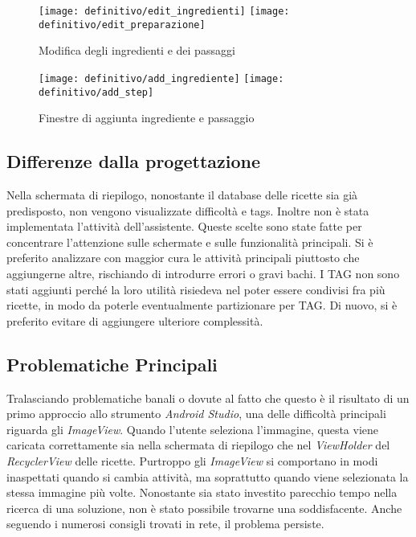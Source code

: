 \begin{figure}[ht]
  \begin{center}
    \texttt{[image: definitivo/edit\_ingredienti]}
    \texttt{[image: definitivo/edit\_preparazione]}
    \caption{Modifica degli ingredienti e dei passaggi}
    \label{fig:def_edit_ricetta}
  \end{center}
\end{figure}

\begin{figure}[ht]
  \begin{center}
    \texttt{[image: definitivo/add\_ingrediente]}
    \texttt{[image: definitivo/add\_step]}
    \caption{Finestre di aggiunta ingrediente e passaggio}
    \label{fig:def_edit_ricetta_1}
  \end{center}
\end{figure}

\clearpage
\subsection{Differenze dalla progettazione}
Nella schermata di riepilogo, nonostante il database delle ricette sia già predisposto, non vengono visualizzate difficoltà e tags.
Inoltre non è stata implementata l'attività dell'assistente.
Queste scelte sono state fatte per concentrare l'attenzione sulle schermate e sulle funzionalità principali.
Si è preferito analizzare con maggior cura le attività principali piuttosto che aggiungerne altre, rischiando di introdurre errori o gravi bachi.
I TAG non sono stati aggiunti perché la loro utilità risiedeva nel poter essere condivisi fra più ricette, in modo da poterle eventualmente partizionare per TAG.
Di nuovo, si è preferito evitare di aggiungere ulteriore complessità.

\subsection{Problematiche Principali}
Tralasciando problematiche banali o dovute al fatto che questo è il risultato di un primo approccio allo strumento \textit{Android Studio}, una delle difficoltà principali riguarda gli \textit{ImageView}.
Quando l'utente seleziona l'immagine, questa viene caricata correttamente sia nella schermata di riepilogo che nel \textit{ViewHolder} del \textit{RecyclerView} delle ricette. 
Purtroppo gli \textit{ImageView} si comportano in modi inaspettati quando si cambia attività, ma soprattutto quando viene selezionata la stessa immagine più volte.
Nonostante sia stato investito parecchio tempo nella ricerca di una soluzione, non è stato possibile trovarne una soddisfacente.
Anche seguendo i numerosi consigli trovati in rete, il problema persiste.


